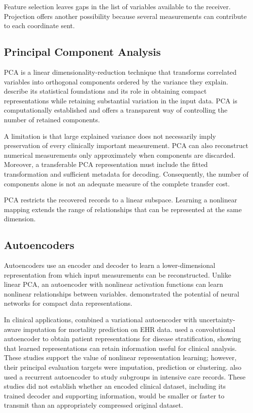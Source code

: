\noindent Feature selection leaves gaps in the list of variables available to the receiver. Projection offers another possibility because several measurements can contribute to each coordinate sent.

\subsection{Principal Component Analysis}\label{principal-component-analysis}

PCA is a linear dimensionality-reduction technique that transforms
correlated variables into orthogonal components ordered by the variance
they explain. \citet{Jolliffe2016} describe its statistical foundations
and its role in obtaining compact representations while retaining
substantial variation in the input data. PCA is computationally
established and offers a transparent way of controlling the number of
retained components.

\noindent A limitation is that large explained variance does not necessarily imply
preservation of every clinically important measurement. PCA can also
reconstruct numerical measurements only approximately when components
are discarded. Moreover, a transferable PCA representation must include
the fitted transformation and sufficient metadata for decoding.
Consequently, the number of components alone is not an adequate measure
of the complete transfer cost.

\noindent PCA restricts the recovered records to a linear subspace. Learning a nonlinear mapping extends the range of relationships that can be represented at the same dimension.

\subsection{Autoencoders}\label{autoencoders}

Autoencoders use an encoder and decoder to learn a lower-dimensional
representation from which input measurements can be reconstructed.
Unlike linear PCA, an autoencoder with nonlinear activation functions
can learn nonlinear relationships between variables. \citet{Hinton2006}
demonstrated the potential of neural networks for compact data
representations.

\noindent In clinical applications, \citet{Jun2019} combined a variational
autoencoder with uncertainty-aware imputation for mortality prediction
on EHR data. \citet{Landi2020} used a convolutional autoencoder to
obtain patient representations for disease stratification, showing that
learned representations can retain information useful for clinical
analysis. These studies support the value of nonlinear representation
learning; however, their principal evaluation targets were imputation,
prediction or clustering. \citet{Merkelbach2023} also used a recurrent autoencoder to study subgroups in intensive care records. These studies did not establish whether an encoded
clinical dataset, including its trained decoder and supporting
information, would be smaller or faster to transmit than an
appropriately compressed original dataset.

